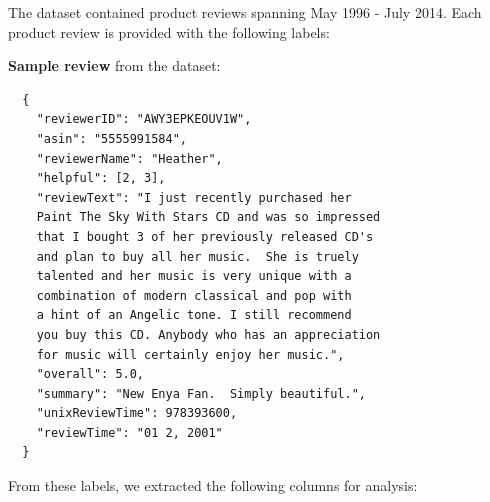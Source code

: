 The dataset contained product reviews spanning May 1996 - July 2014. Each product review is provided with the following labels:\newline
{}

\smallskip

\textbf{Sample review} from the dataset:
\begin{verbatim}
  {
    "reviewerID": "AWY3EPKEOUV1W", 
    "asin": "5555991584", 
    "reviewerName": "Heather", 
    "helpful": [2, 3], 
    "reviewText": "I just recently purchased her 
    Paint The Sky With Stars CD and was so impressed
    that I bought 3 of her previously released CD's
    and plan to buy all her music.  She is truely
    talented and her music is very unique with a
    combination of modern classical and pop with
    a hint of an Angelic tone. I still recommend
    you buy this CD. Anybody who has an appreciation
    for music will certainly enjoy her music.",
    "overall": 5.0, 
    "summary": "New Enya Fan.  Simply beautiful.", 
    "unixReviewTime": 978393600, 
    "reviewTime": "01 2, 2001"
  }
\end{verbatim}

From these labels, we extracted the following columns for analysis:\newline
{}

